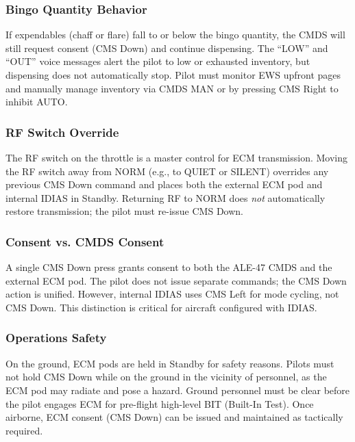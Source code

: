 \documentclass[11pt, a4paper, twoside]{report}
\begin{document}
\subsubsection{Bingo Quantity Behavior}
\label{sec:C5-S2-S4-S2}

If expendables (chaff or flare) fall to or below the bingo quantity, the CMDS will still request consent (CMS Down) and continue dispensing. The ``LOW'' and ``OUT'' voice messages alert the pilot to low or exhausted inventory, but dispensing does not automatically stop. Pilot must monitor EWS upfront pages and manually manage inventory via CMDS MAN or by pressing CMS Right to inhibit AUTO.

\subsubsection{RF Switch Override}
\label{sec:C5-S2-S4-S3}

The RF switch on the throttle is a master control for ECM transmission. Moving the RF switch away from NORM (e.g., to QUIET or SILENT) overrides any previous CMS Down command and places both the external ECM pod and internal IDIAS in Standby. Returning RF to NORM does \textit{not} automatically restore transmission; the pilot must re-issue CMS Down.

\subsubsection{Consent vs. CMDS Consent}
\label{sec:C5-S2-S4-S4}

A single CMS Down press grants consent to both the ALE-47 CMDS and the external ECM pod. The pilot does not issue separate commands; the CMS Down action is unified. However, internal IDIAS uses CMS Left for mode cycling, not CMS Down. This distinction is critical for aircraft configured with IDIAS.

\subsubsection{Operations Safety}
\label{sec:C5-S2-S4-S5}

On the ground, ECM pods are held in Standby for safety reasons. Pilots must not hold CMS Down while on the ground in the vicinity of personnel, as the ECM pod may radiate and pose a hazard. Ground personnel must be clear before the pilot engages ECM for pre-flight high-level BIT (Built-In Test). Once airborne, ECM consent (CMS Down) can be issued and maintained as tactically required.
\end{document}

